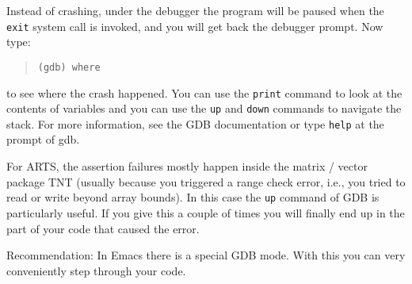 Instead of crashing, under the debugger the program will be paused
when the \verb|exit| system call is invoked, and you will get back the
debugger prompt. Now type:
\begin{quote}
  \verb|(gdb) where| 
\end{quote}  
to see where the crash happened. You can use the \verb|print| command to
look at the contents of variables and you can use the \verb|up| and \verb|down|
commands to navigate the stack. For more information, see the GDB
documentation or type \verb|help| at the prompt of gdb.

For ARTS, the assertion failures mostly happen inside the matrix /
vector package TNT (usually because you triggered a range check error,
i.e., you tried to read or write beyond array bounds). In this case the
\verb|up| command of GDB is particularly useful. If you give this a
couple of times you will finally end up in the part of your code that
caused the error.

Recommendation: In Emacs there is a special GDB mode. With this you
can very conveniently step through your code.




